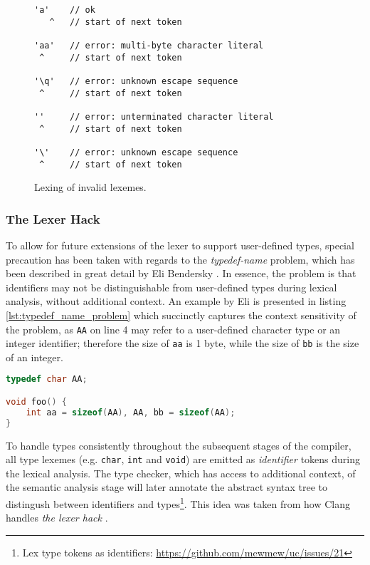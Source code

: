 \begin{figure}[htbp]
	\centering
\begin{BVerbatim}
'a'    // ok
   ^   // start of next token

'aa'   // error: multi-byte character literal
 ^     // start of next token

'\q'   // error: unknown escape sequence
 ^     // start of next token

''     // error: unterminated character literal
 ^     // start of next token

'\'    // error: unknown escape sequence
 ^     // start of next token
\end{BVerbatim}
	\caption{Lexing of invalid lexemes.}
	\label{fig:invalid_lexemes}
\end{figure}

\subsubsection{The Lexer Hack}

To allow for future extensions of the lexer to support user-defined types, special precaution has been taken with regards to the \textit{typedef-name} problem, which has been described in great detail by Eli Bendersky \cite{typedef_name_problem}. In essence, the problem is that identifiers may not be distinguishable from user-defined types during lexical analysis, without additional context. An example by Eli is presented in listing \ref{lst:typedef_name_problem} which succinctly captures the context sensitivity of the problem, as \texttt{AA} on line 4 may refer to a user-defined character type or an integer identifier; therefore the size of \texttt{aa} is 1 byte, while the size of \texttt{bb} is the size of an integer.

\begin{lstlisting}[language=C,style=c,caption={An example of the \textit{typedef-name} problem.},label={lst:typedef_name_problem}]
typedef char AA;

void foo() {
	int aa = sizeof(AA), AA, bb = sizeof(AA);
}
\end{lstlisting}

To handle types consistently throughout the subsequent stages of the compiler, all type lexemes (e.g. \texttt{char}, \texttt{int} and \texttt{void}) are emitted as \textit{identifier} tokens during the lexical analysis. The type checker, which has access to additional context, of the semantic analysis stage will later annotate the abstract syntax tree to distingush between identifiers and types\footnote{Lex type tokens as identifiers: \url{https://github.com/mewmew/uc/issues/21}}. This idea was taken from how Clang handles \textit{the lexer hack} \cite{the_lexer_hack,clang_no_lexer_hack}.
